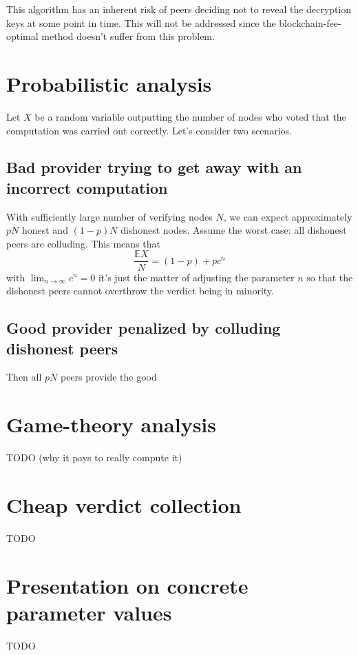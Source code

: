 \documentclass[12pt]{article}
\begin{document}
This algorithm has an inherent risk of peers deciding not to reveal the decryption keys at some point in time. 
This will not be addressed since the blockchain-fee-optimal method doesn't suffer from this problem.

\section{Probabilistic analysis}
Let $X$ be a random variable outputting the number of nodes who voted that the computation was carried out correctly.
Let's consider two scenarios. 
\subsection{Bad provider trying to get away with an incorrect computation}
With sufficiently large number of verifying nodes $N$, we can expect approximately $pN$ honest and $(1-p)N$ dishonest nodes. 
Assume the worst case: all dishonest peers are colluding. This means that 
\begin{equation}
\frac{\mathbb{E}X}{N} = (1-p) + pc^n
\end{equation}
with $\lim_{n\to\infty} c^n = 0$ it's just the matter of adjusting the parameter $n$ so that the dishonest peers cannot overthrow the verdict being in minority.

\subsection{Good provider penalized by colluding dishonest peers}
Then all $pN$ peers provide the good

\section{Game-theory analysis} 
TODO (why it pays to really compute it)

\section{Cheap verdict collection}
TODO
\section{Presentation on concrete parameter values}
TODO
\end{document}
